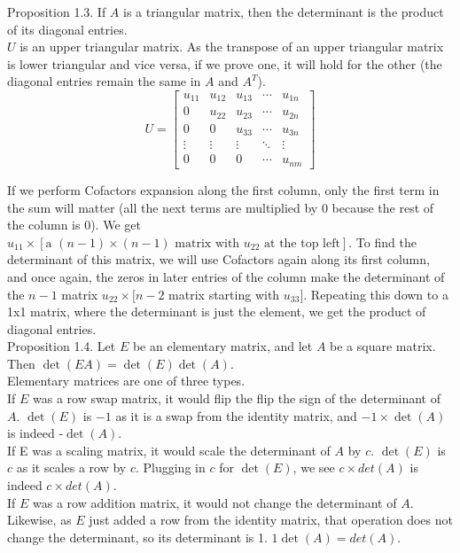 \documentclass[12pt]{article}
\begin{document}
Proposition 1.3. If $A$ is a triangular matrix, then the determinant is the product of its diagonal entries.\\
$U$ is an upper triangular matrix. As the transpose of an upper triangular matrix is lower triangular and vice versa, if we prove one, it will hold for the other (the diagonal entries remain the same in $A$ and $A^T$).\\

\begin{equation*}
U = \begin{bmatrix}
u_{11} & u_{12} & u_{13} & \cdots & u_{1n}\\
0 & u_{22} & u_{23} & \cdots & u_{2n}\\
0 & 0 & u_{33} & \cdots & u_{3n}\\
\vdots & \vdots & \vdots & \ddots & \vdots\\
0 & 0 & 0 & \cdots & u_{nm} 
\end{bmatrix}
\end{equation*}


If we perform Cofactors expansion along the first column, only the first term in the sum will matter (all the next terms are multiplied by 0 because the rest of the column is 0). We get $u_{11} \times \left[ \text{a } (n-1) \times (n-1) \text{ matrix with } u_{22} \text{ at the top left} \right]$. To find the determinant of this matrix, we will use Cofactors again along its first column, and once again, the zeros in later entries of the column make the determinant of the $n-1$ matrix $u_{22} \times [n-2$ matrix starting with $u_{33}]$. Repeating this down to a 1x1 matrix, where the determinant is just the element, we get the product of diagonal entries.\\

Proposition 1.4. Let $E$ be an elementary matrix, and let $A$ be a square matrix. Then $\det(EA) = \det(E) \det(A)$. \\
Elementary matrices are one of three types.\\
If $E$ was a row swap matrix, it would flip the flip the sign of the determinant of $A$. $\det(E)$ is $-1$ as it is a swap from the identity matrix, and $-1 \times \det(A)$ is indeed -$\det(A)$.\\
If E was a scaling matrix, it would scale the determinant of $A$ by $c$. $\det(E)$ is $c$ as it scales a row by $c$. Plugging in $c$ for $\det(E)$, we see $c \times det(A)$ is indeed $c \times det(A)$.\\
If $E$ was a row addition matrix, it would not change the determinant of $A$. Likewise, as $E$ just added a row from the identity matrix, that operation does not change the determinant, so its determinant is 1. $1 \det(A) = det(A)$.\\
\end{document}
